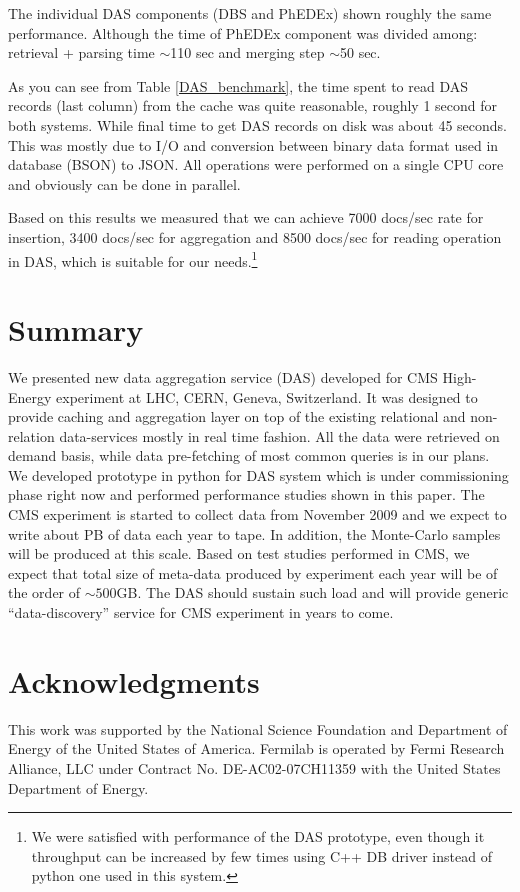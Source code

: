 \documentclass[a4paper]{jpconf}
\begin{document}
The individual DAS components (DBS and PhEDEx) shown roughly the same performance.
Although the time of PhEDEx component was divided among: retrieval + parsing 
time $\sim$110 sec and merging step $\sim$50 sec.

As you can see from Table \ref{DAS_benchmark},
the time spent to read DAS records (last column) from the cache was quite
reasonable, roughly 1 second for both systems. While final time to
get DAS records on disk was about 45 seconds. This was mostly due to I/O and
conversion between binary data format used in database (BSON) to JSON.
All operations were performed on a single CPU core and obviously can be done
in parallel.

Based on this results we measured that we can achieve 7000 docs/sec rate
for insertion, 3400 docs/sec for aggregation and 8500 docs/sec for reading operation
in DAS, which is suitable for our 
needs.\footnote{We were satisfied with performance of the DAS prototype,
even though it throughput can be increased by few times
using C++ DB driver instead of python one used in this system.}

\section{Summary}
We presented new data aggregation service (DAS) developed for CMS High-Energy experiment
at LHC, CERN, Geneva, Switzerland. It was designed to provide caching and
aggregation layer on top of the existing relational and non-relation data-services
mostly in real time fashion. All the data were retrieved on demand basis,
while data pre-fetching of most common queries is in our plans. We developed
prototype in python for DAS system which is under commissioning phase right now 
and performed performance studies shown in this paper. 
The CMS experiment is started to
collect data from November 2009 and we expect to write about PB of data each
year to tape. In addition, the Monte-Carlo samples will be produced at this scale.
Based on test studies performed in CMS, we expect that total size of
meta-data produced by experiment each year will be of the order of
$\sim500$GB. The DAS should sustain such load and will provide generic 
``data-discovery'' service for CMS experiment in years to come.

\section{Acknowledgments}

This work was supported by the National Science Foundation and Department of Energy of the United States of America. Fermilab is operated by Fermi Research Alliance, LLC under Contract
No. DE-AC02-07CH11359 with the United States Department of Energy.
\end{document}
